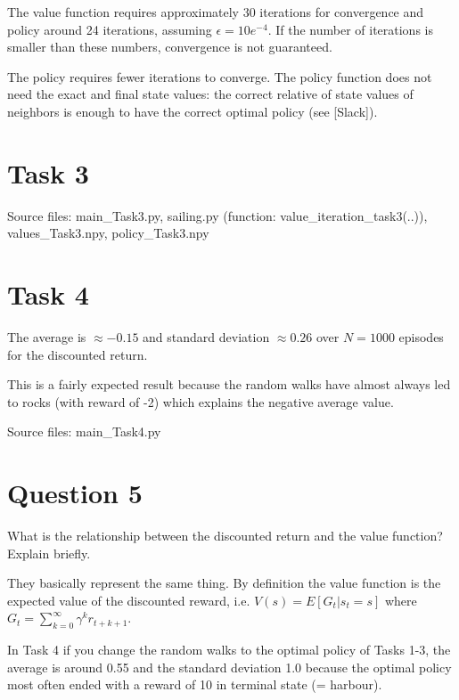 \documentclass[12pt]{article}
\begin{document}
The value function requires approximately 30 iterations for convergence and policy around 24 iterations, assuming $\epsilon = 10e^{-4}$. If the number of iterations is smaller than these numbers, convergence is not guaranteed.
\newline

The policy requires fewer iterations to converge. The policy function does not need the exact and final state values: the correct relative of state values of neighbors is enough to have the correct optimal policy (see [Slack]).

\section*{Task 3}

\noindent
Source files: main\_Task3.py, sailing.py (function: value\_iteration\_task3(..)), values\_Task3.npy, policy\_Task3.npy

\section*{Task 4}

The average is $\approx -0.15$ and standard deviation $\approx 0.26$ over $N = 1000$ episodes for the discounted return. 
\newline

This is a fairly expected result because the random walks have almost always led to rocks (with reward of -2) which explains the negative average value.
\newline

\noindent
Source files: main\_Task4.py

\section*{Question 5}

What is the relationship between the discounted return and the value function?  
Explain briefly.
\newline

They basically represent the same thing. By definition the value function is the expected value of the discounted reward, i.e. $V(s) = E[G_t|s_t=s]$ where $G_t=\sum_{k=0}^{\infty} \gamma^k r_{t+k+1}$.
\newline

In Task 4 if you change the random walks to the optimal policy of Tasks 1-3, the average is around  0.55 and the standard deviation 1.0 because the optimal policy most often ended with a reward of 10 in terminal state (= harbour).   
\end{document}
